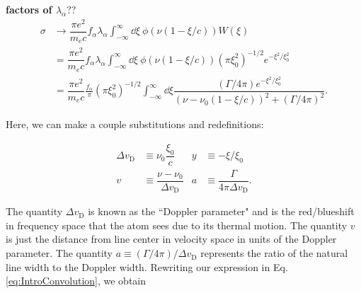 {\bf factors of $\lambda_{\alpha}??$}
\begin{align}
\sigma &\to \dfrac{\pi e^2}{m_e c}f_{\alpha}\lambda_{\alpha} \int_{-\infty}^{\infty} \dd \xi\ \phi(\nu(1-\xi/c)) W(\xi)\\
&= \dfrac{\pi e^2}{m_e c}f_{\alpha}\lambda_{\alpha} \int_{-\infty}^{\infty}\dd \xi\ \phi(\nu(1 - \xi/c)) \left(\pi \xi_{0}^{2} \right)^{-1/2} e^{-\xi^2/\xi_{0}^2} \\
&= \dfrac{\pi e^2}{m_e c} \frac{f_{\alpha}}{\pi} \left( \pi \xi_0^2 \right)^{-1/2} \int_{-\infty}^{\infty} \dd \xi \dfrac{(\Gamma/4\pi) e^{-\xi^2/\xi_{0}^{2}}}{(\nu-\nu_{0}(1-\xi/c))^2+(\Gamma/4\pi)^2}. \label{eq:IntroConvolution}
\end{align}

Here, we can make a couple substitutions and redefinitions:

\begin{align}
\Delta v_{\text{D}} &\equiv \nu_{0}\dfrac{\xi_{0}}{c} & y &\equiv -\xi/\xi_0 \\
v &\equiv \dfrac{\nu - \nu_{0}}{\Delta v_{\text{D}}} & a &\equiv \dfrac{\Gamma}{4\pi \Delta v_{\text{D}}}.
\end{align}

The quantity $\Delta v_{\text{D}}$ is known as the ``Doppler parameter" and is the red/blueshift in frequency space that the atom sees due to its thermal motion. The quantity $v$ is just the distance from line center in velocity space in units of the Doppler parameter. The quantity $a \equiv (\Gamma/4\pi)/\Delta v_{\text{D}}$ represents the ratio of the natural line width to the Doppler width. Rewriting our expression in Eq. \ref{eq:IntroConvolution}, we obtain

